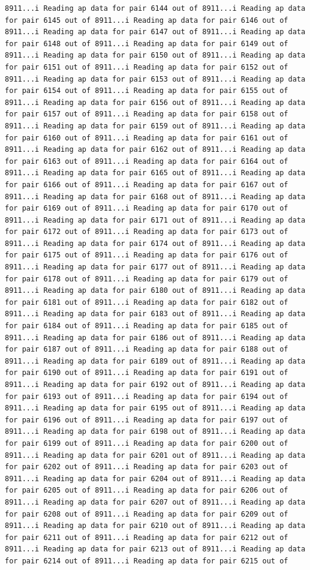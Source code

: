 \documentclass[
]{article}
\begin{document}
\begin{verbatim}
8911...i Reading ap data for pair 6144 out of 8911...i Reading ap data for pair 6145 out of 8911...i Reading ap data for pair 6146 out of 8911...i Reading ap data for pair 6147 out of 8911...i Reading ap data for pair 6148 out of 8911...i Reading ap data for pair 6149 out of 8911...i Reading ap data for pair 6150 out of 8911...i Reading ap data for pair 6151 out of 8911...i Reading ap data for pair 6152 out of 8911...i Reading ap data for pair 6153 out of 8911...i Reading ap data for pair 6154 out of 8911...i Reading ap data for pair 6155 out of 8911...i Reading ap data for pair 6156 out of 8911...i Reading ap data for pair 6157 out of 8911...i Reading ap data for pair 6158 out of 8911...i Reading ap data for pair 6159 out of 8911...i Reading ap data for pair 6160 out of 8911...i Reading ap data for pair 6161 out of 8911...i Reading ap data for pair 6162 out of 8911...i Reading ap data for pair 6163 out of 8911...i Reading ap data for pair 6164 out of 8911...i Reading ap data for pair 6165 out of 8911...i Reading ap data for pair 6166 out of 8911...i Reading ap data for pair 6167 out of 8911...i Reading ap data for pair 6168 out of 8911...i Reading ap data for pair 6169 out of 8911...i Reading ap data for pair 6170 out of 8911...i Reading ap data for pair 6171 out of 8911...i Reading ap data for pair 6172 out of 8911...i Reading ap data for pair 6173 out of 8911...i Reading ap data for pair 6174 out of 8911...i Reading ap data for pair 6175 out of 8911...i Reading ap data for pair 6176 out of 8911...i Reading ap data for pair 6177 out of 8911...i Reading ap data for pair 6178 out of 8911...i Reading ap data for pair 6179 out of 8911...i Reading ap data for pair 6180 out of 8911...i Reading ap data for pair 6181 out of 8911...i Reading ap data for pair 6182 out of 8911...i Reading ap data for pair 6183 out of 8911...i Reading ap data for pair 6184 out of 8911...i Reading ap data for pair 6185 out of 8911...i Reading ap data for pair 6186 out of 8911...i Reading ap data for pair 6187 out of 8911...i Reading ap data for pair 6188 out of 8911...i Reading ap data for pair 6189 out of 8911...i Reading ap data for pair 6190 out of 8911...i Reading ap data for pair 6191 out of 8911...i Reading ap data for pair 6192 out of 8911...i Reading ap data for pair 6193 out of 8911...i Reading ap data for pair 6194 out of 8911...i Reading ap data for pair 6195 out of 8911...i Reading ap data for pair 6196 out of 8911...i Reading ap data for pair 6197 out of 8911...i Reading ap data for pair 6198 out of 8911...i Reading ap data for pair 6199 out of 8911...i Reading ap data for pair 6200 out of 8911...i Reading ap data for pair 6201 out of 8911...i Reading ap data for pair 6202 out of 8911...i Reading ap data for pair 6203 out of 8911...i Reading ap data for pair 6204 out of 8911...i Reading ap data for pair 6205 out of 8911...i Reading ap data for pair 6206 out of 8911...i Reading ap data for pair 6207 out of 8911...i Reading ap data for pair 6208 out of 8911...i Reading ap data for pair 6209 out of 8911...i Reading ap data for pair 6210 out of 8911...i Reading ap data for pair 6211 out of 8911...i Reading ap data for pair 6212 out of 8911...i Reading ap data for pair 6213 out of 8911...i Reading ap data for pair 6214 out of 8911...i Reading ap data for pair 6215 out of 
\end{verbatim}
\end{document}
